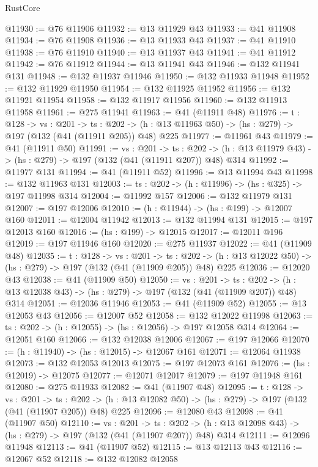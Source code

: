 \begin{lexlean}{RustCore}
\begin{coremodule}
@11930 := @76 @11906
@11932 := @13 @11929 @43
@11933 := @41 @11908
@11934 := @76 @11908
@11936 := @13 @11933 @43
@11937 := @41 @11910
@11938 := @76 @11910
@11940 := @13 @11937 @43
@11941 := @41 @11912
@11942 := @76 @11912
@11944 := @13 @11941 @43
@11946 := @132 @11941 @131
@11948 := @132 @11937 @11946
@11950 := @132 @11933 @11948
@11952 := @132 @11929 @11950
@11954 := @132 @11925 @11952
@11956 := @132 @11921 @11954
@11958 := @132 @11917 @11956
@11960 := @132 @11913 @11958
@11961 := @275 @11941
@11963 := @41 (@11911 @48)
@11976 := {t : @128} ->
  {vs : @201} ->
  {ts : @202} -> (h : @13 @11963 @50) -> (hs : @279) -> @197 (@132 (@41 (@11911 @205)) @48) @225
@11977 := @11961 @43
@11979 := @41 (@11911 @50)
@11991 := {vs : @201} ->
  {ts : @202} -> (h : @13 @11979 @43) -> (hs : @279) -> @197 (@132 (@41 (@11911 @207)) @48) @314
@11992 := @11977 @131
@11994 := @41 (@11911 @52)
@11996 := @13 @11994 @43
@11998 := @132 @11963 @131
@12003 := {ts : @202} -> (h : @11996) -> (hs : @325) -> @197 @11998 @314
@12004 := @11992 @157
@12006 := @132 @11979 @131
@12007 := @197 @12006
@12010 := (h : @11944) -> (hs : @199) -> @12007 @160
@12011 := @12004 @11942
@12013 := @132 @11994 @131
@12015 := @197 @12013 @160
@12016 := (hs : @199) -> @12015
@12017 := @12011 @196
@12019 := @197 @11946 @160
@12020 := @275 @11937
@12022 := @41 (@11909 @48)
@12035 := {t : @128} ->
  {vs : @201} ->
  {ts : @202} -> (h : @13 @12022 @50) -> (hs : @279) -> @197 (@132 (@41 (@11909 @205)) @48) @225
@12036 := @12020 @43
@12038 := @41 (@11909 @50)
@12050 := {vs : @201} ->
  {ts : @202} -> (h : @13 @12038 @43) -> (hs : @279) -> @197 (@132 (@41 (@11909 @207)) @48) @314
@12051 := @12036 @11946
@12053 := @41 (@11909 @52)
@12055 := @13 @12053 @43
@12056 := @12007 @52
@12058 := @132 @12022 @11998
@12063 := {ts : @202} -> (h : @12055) -> (hs : @12056) -> @197 @12058 @314
@12064 := @12051 @160
@12066 := @132 @12038 @12006
@12067 := @197 @12066
@12070 := (h : @11940) -> (hs : @12015) -> @12067 @161
@12071 := @12064 @11938
@12073 := @132 @12053 @12013
@12075 := @197 @12073 @161
@12076 := (hs : @12019) -> @12075
@12077 := @12071 @12017
@12079 := @197 @11948 @161
@12080 := @275 @11933
@12082 := @41 (@11907 @48)
@12095 := {t : @128} ->
  {vs : @201} ->
  {ts : @202} -> (h : @13 @12082 @50) -> (hs : @279) -> @197 (@132 (@41 (@11907 @205)) @48) @225
@12096 := @12080 @43
@12098 := @41 (@11907 @50)
@12110 := {vs : @201} ->
  {ts : @202} -> (h : @13 @12098 @43) -> (hs : @279) -> @197 (@132 (@41 (@11907 @207)) @48) @314
@12111 := @12096 @11948
@12113 := @41 (@11907 @52)
@12115 := @13 @12113 @43
@12116 := @12067 @52
@12118 := @132 @12082 @12058

\end{coremodule}
\end{lexlean}
